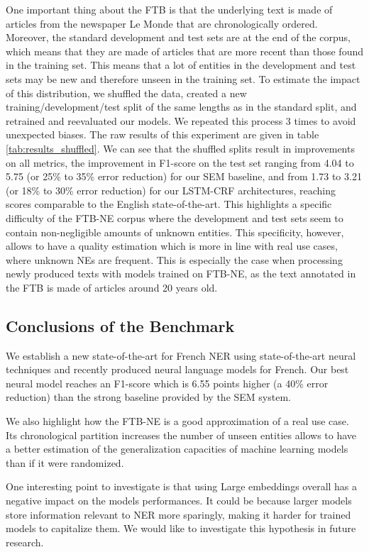One important thing about the FTB is that the underlying text is made of articles from the newspaper Le Monde that are chronologically ordered. Moreover, the standard development and test sets are at the end of the corpus, which means that they are made of articles that are more recent than those found in the training set. This means that a lot of entities in the development and test sets may be new and therefore unseen in the training set. To estimate the impact of this distribution, we shuffled the data, created a new training/development/test split of the same lengths as in the standard split, and retrained and reevaluated our models. We repeated this process 3 times to avoid unexpected biases. The raw results of this experiment are given in table \ref{tab:results_shuffled}. We can see that the shuffled splits result in improvements on all metrics, the improvement in F1-score on the test set ranging from 4.04 to 5.75 (or 25\% to 35\% error reduction) for our SEM baseline, and from 1.73 to 3.21 (or 18\% to 30\% error reduction) for our LSTM-CRF architectures, reaching scores comparable to the English state-of-the-art. This highlights a specific difficulty of the FTB-NE corpus where the development and test sets seem to contain non-negligible amounts of unknown entities. This specificity, however, allows to have a quality estimation which is more in line with real use cases, where unknown NEs are frequent. This is especially the case when processing newly produced texts with models trained on FTB-NE, as the text annotated in the FTB is made of articles around 20 years old.

\subsection{Conclusions of the Benchmark}
\label{sec:conclusion}

We establish a new state-of-the-art for French NER using state-of-the-art neural techniques and recently produced neural language models for French. Our best neural model reaches an F1-score which is 6.55 points higher (a 40\% error reduction) than the strong baseline provided by the SEM system.

We also highlight how the FTB-NE is a good approximation of a real use case. Its chronological partition increases the number of unseen entities allows to have a better estimation of the generalization capacities of machine learning models than if it were randomized.

One interesting point to investigate is that using Large embeddings overall has a negative impact on the models performances. It could be because larger models store information relevant to NER more sparingly, making it harder for trained models to capitalize them. We would like to investigate this hypothesis in future research.

